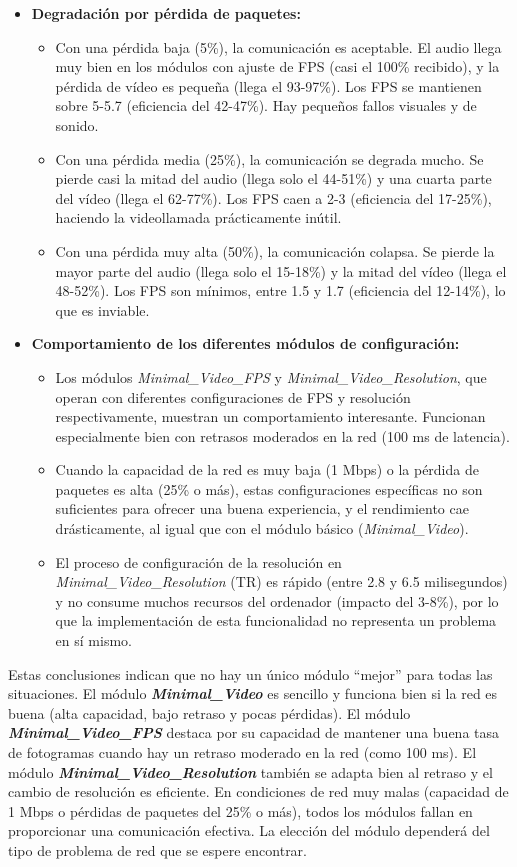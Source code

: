 \begin{itemize}
\item \textbf{Degradación por pérdida de paquetes:}
\begin{itemize}
    \item Con una pérdida baja (5\%), la comunicación es aceptable. El audio llega muy bien en los módulos con ajuste de FPS (casi el 100\% recibido), y la pérdida de vídeo es pequeña (llega el 93-97\%). Los FPS se mantienen sobre 5-5.7 (eficiencia del 42-47\%). Hay pequeños fallos visuales y de sonido.
    \item Con una pérdida media (25\%), la comunicación se degrada mucho. Se pierde casi la mitad del audio (llega solo el 44-51\%) y una cuarta parte del vídeo (llega el 62-77\%). Los FPS caen a 2-3 (eficiencia del 17-25\%), haciendo la videollamada prácticamente inútil.
    \item Con una pérdida muy alta (50\%), la comunicación colapsa. Se pierde la mayor parte del audio (llega solo el 15-18\%) y la mitad del vídeo (llega el 48-52\%). Los FPS son mínimos, entre 1.5 y 1.7 (eficiencia del 12-14\%), lo que es inviable.
\end{itemize}

\item \textbf{Comportamiento de los diferentes módulos de configuración:}
\begin{itemize}
    \item Los módulos \textit{Minimal\_Video\_FPS} y \textit{Minimal\_Video\_Resolution}, que operan con diferentes configuraciones de FPS y resolución respectivamente, muestran un comportamiento interesante. Funcionan especialmente bien con retrasos moderados en la red (100 ms de latencia).
    \item Cuando la capacidad de la red es muy baja (1 Mbps) o la pérdida de paquetes es alta (25\% o más), estas configuraciones específicas no son suficientes para ofrecer una buena experiencia, y el rendimiento cae drásticamente, al igual que con el módulo básico (\textit{Minimal\_Video}).
    \item El proceso de configuración de la resolución en \textit{Minimal\_Video\_Resolution} (TR) es rápido (entre 2.8 y 6.5 milisegundos) y no consume muchos recursos del ordenador (impacto del 3-8\%), por lo que la implementación de esta funcionalidad no representa un problema en sí mismo.
\end{itemize}
\end{itemize}

Estas conclusiones indican que no hay un único módulo ``mejor'' para todas las situaciones.
El módulo \textbf{\textit{Minimal\_Video}} es sencillo y funciona bien si la red es buena (alta capacidad, bajo retraso y pocas pérdidas).
El módulo \textbf{\textit{Minimal\_Video\_FPS}} destaca por su capacidad de mantener una buena tasa de fotogramas cuando hay un retraso moderado en la red (como 100 ms).
El módulo \textbf{\textit{Minimal\_Video\_Resolution}} también se adapta bien al retraso y el cambio de resolución es eficiente.
En condiciones de red muy malas (capacidad de 1 Mbps o pérdidas de paquetes del 25\% o más), todos los módulos fallan en proporcionar una comunicación efectiva. La elección del módulo dependerá del tipo de problema de red que se espere encontrar.

